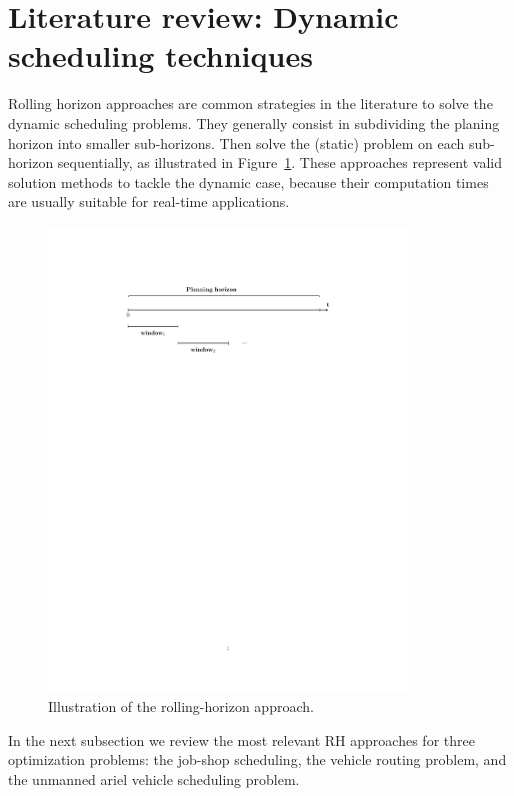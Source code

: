 
\section{Literature review: Dynamic scheduling techniques}

Rolling horizon approaches are common strategies in the literature to solve the dynamic scheduling problems. They generally consist in subdividing the planing horizon into smaller sub-horizons. Then solve the (static) problem on each sub-horizon sequentially, as illustrated in Figure~\ref{fig:rh}.
These approaches represent valid solution methods to tackle the dynamic case, because their computation times are usually suitable for real-time applications.

\begin{figure}[h!]
	\centering
	\includegraphics[trim=120 575 120 100,clip,width=0.85\textwidth]{images/rh.pdf}
	\caption{Illustration of the rolling-horizon approach.}
	\label{fig:rh}
\end{figure}
In the next subsection we review the most relevant \acs{RH} approaches for three optimization problems: the job-shop scheduling, the vehicle routing problem, and the unmanned ariel vehicle scheduling problem.


